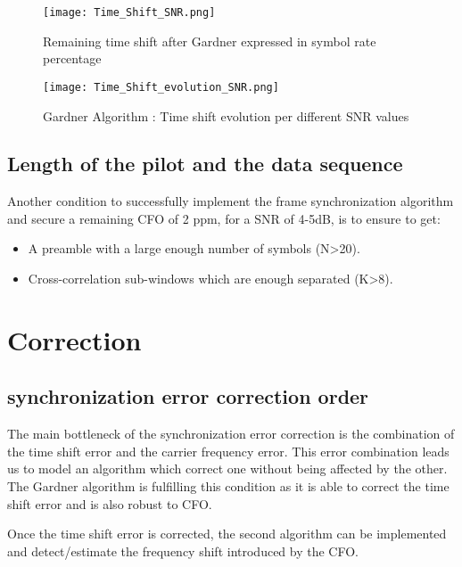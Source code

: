\begin{figure}[H]
    \centering
    \texttt{[image: Time\_Shift\_SNR.png]}
    \caption{Remaining time shift after Gardner expressed in symbol rate percentage}
    \label{Time_Shift_SNR}
\end{figure}

\begin{figure}[H]
    \centering
    \texttt{[image: Time\_Shift\_evolution\_SNR.png]}
    \caption{Gardner Algorithm : Time shift evolution per different SNR values}
    \label{Time_Shift_evolution_SNR}
\end{figure}


\subsection{Length of the pilot and the data sequence}

Another condition to successfully implement the frame synchronization algorithm and secure a remaining 
CFO of 2 ppm, for a SNR of 4-5dB, is to ensure to get:
\begin{itemize}
    \item A preamble with a large enough number of symbols (N>20).
    \item Cross-correlation sub-windows which are enough separated (K>8).  
\end{itemize}

\section{Correction}

\subsection{synchronization error correction order}

The main bottleneck of the synchronization error correction is the combination of the time shift error and
 the carrier frequency error. This error combination leads us to model an algorithm which correct one without being affected by the other. The Gardner algorithm is fulfilling this condition as it is able to correct the time shift error and is also robust to CFO. \par
Once the time shift error is corrected, the second algorithm can be implemented and detect/estimate the frequency shift introduced by the CFO. \par

